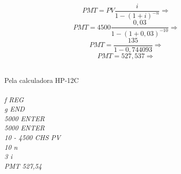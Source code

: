\documentclass[a4paper, 12pt]{article}
\begin{document}
\begin{itemize}
$$ PMT = PV\frac{i}{1-(1+i)^{-n}} \Rightarrow $$
$$ PMT = 4500\frac{0,03}{1-(1+0,03)^{-10}} \Rightarrow $$
$$ PMT = \frac{135}{1-0,744093} \Rightarrow $$
$$ \boxed{PMT = 527,537} \Rightarrow $$

\\
Pela calculadora HP-12C\\\\
\emph{f REG}\\
\emph{g END}\\
\emph{5000 ENTER}\\
\emph{5000 ENTER}\\
\emph{10  - 4500 CHS PV} \\
\emph{10 n}\\
\emph{3 i}\\
\emph{PMT 527,54}\\

\end{itemize}
\end{document}
